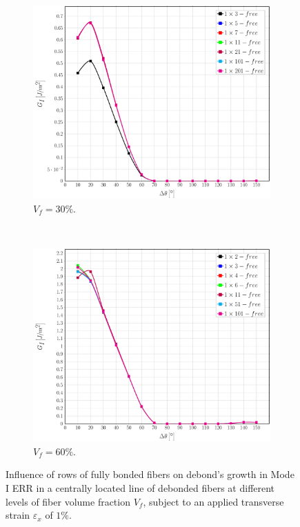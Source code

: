 \documentclass[review]{elsarticle}
\begin{document}
\begin{figure}[!h]
\centering
    \begin{subfigure}[b]{0.45\textwidth}
        \includegraphics[width=\textwidth]{abovefibers-vf30-GI.pdf}
        \caption{$V_{f}=30\%$.}\label{subfig:abovefiber30MI}
    \end{subfigure} ~
    \begin{subfigure}[b]{0.45\textwidth}
        \includegraphics[width=\textwidth]{abovefibers-vf60-GI.pdf}
        \caption{$V_{f}=60\%$.}\label{subfig:abovefiber60MI}
    \end{subfigure}

\caption{Influence of rows of fully bonded fibers on debond's growth in Mode I ERR in a centrally located line of debonded fibers at different levels of fiber volume fraction $V_{f}$, subject to an applied transverse strain $\varepsilon_{x}$ of $1\%$.}\label{fig:abovefibersMI}
\end{figure}
\end{document}
